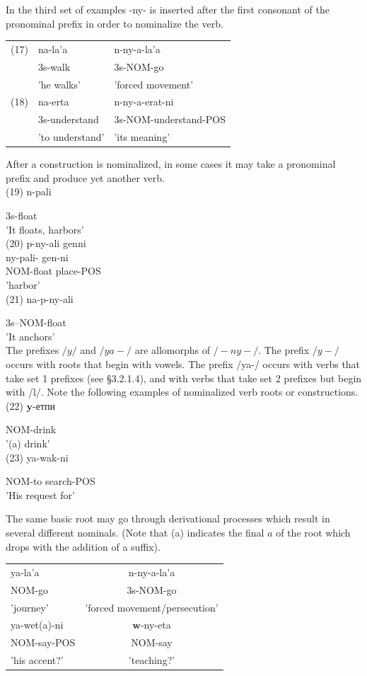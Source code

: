 \documentclass[10pt]{article}
\begin{document}
In the third set of examples -ny- is inserted after the first consonant of the pronominal prefix in order to nominalize the verb.

\begin{center}
\begin{tabular}{lll}
(17) & na-la'a & n-ny-a-la'a \\
 & 3s-walk & 3s-NOM-go \\
 & 'he walks' & 'forced movement' \\
(18) & na-erta & n-ny-a-erat-ni \\
 & 3s-understand & 3s-NOM-understand-POS \\
 & 'to understand' & 'its meaning' \\
\end{tabular}
\end{center}

After a construction is nominalized, in some cases it may take a pronominal prefix and produce yet another verb.\\
(19) n-pali

3s-float\\
'It floats, harbors'\\
(20) p-ny-ali genni\\
ny-pali- gen-ni\\
NOM-float place-POS\\
'harbor'\\
(21) na-p-ny-ali

3s--NOM-float\\
'It anchors'\\
The prefixes \(/ y /\) and \(/ y a-/\) are allomorphs of \(/-n y-/\). The prefix \(/ y-/\) occurs with roots that begin with vowels. The prefix /ya-/ occurs with verbs that take set 1 prefixes (see §3.2.1.4), and with verbs that take set 2 prefixes but begin with /l/. Note the following examples of nominalized verb roots or constructions.\\
(22) \(\boldsymbol{y}\)-етпи

NOM-drink\\
'(a) drink'\\
(23) ya-wak-ni

NOM-to search-POS\\
'His request for'

The same basic root may go through derivational processes which result in several different nominals. (Note that (a) indicates the final \(a\) of the root which drops with the addition of a suffix).

\begin{center}
\begin{tabular}{lc}
ya-la'a & n-ny-a-la'a \\
NOM-go & 3s-NOM-go \\
'journey' & 'forced movement/persecution' \\
ya-wet(a)-ni & \(\boldsymbol{w}\)-ny-eta \\
NOM-say-POS & NOM-say \\
'his accent?' & 'teaching?' \\
\end{tabular}
\end{center}
\end{document}
